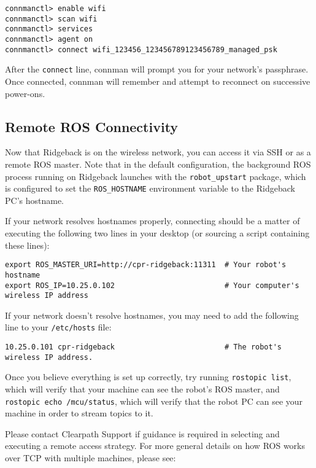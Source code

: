 \documentclass[]{clearpath-latex/clearpath-manual}
\begin{document}
\begin{lstlisting}
connmanctl> enable wifi
connmanctl> scan wifi
connmanctl> services
connmanctl> agent on
connmanctl> connect wifi_123456_123456789123456789_managed_psk
\end{lstlisting}

After the \lstinline{connect} line, connman will prompt you for your network's passphrase. Once connected, connman will remember and attempt to reconnect on successive power-ons.

\subsection{Remote ROS Connectivity}

Now that Ridgeback is on the wireless network, you can access it via SSH or as a remote ROS master. Note that in the default configuration, the background ROS process running on Ridgeback launches with the \lstinline{robot_upstart} package, which is configured to set the \lstinline{ROS_HOSTNAME} environment variable to the Ridgeback PC's hostname.

If your network resolves hostnames properly, connecting should be a matter of executing the following two lines in your desktop (or sourcing a script containing these lines):

\begin{lstlisting}
export ROS_MASTER_URI=http://cpr-ridgeback:11311  # Your robot's hostname
export ROS_IP=10.25.0.102                         # Your computer's wireless IP address
\end{lstlisting}

If your network doesn't resolve hostnames, you may need to add the following line to your \lstinline{/etc/hosts} file:

\begin{lstlisting}
10.25.0.101 cpr-ridgeback                         # The robot's wireless IP address.
\end{lstlisting}

Once you believe everything is set up correctly, try running \lstinline{rostopic list}, which will verify that your machine can see the robot's ROS master, and \lstinline{rostopic echo /mcu/status}, which will verify that the robot PC can see your machine in order to stream topics to it.

Please contact Clearpath Support if guidance is required in selecting and executing a remote access strategy.
For more general details on how ROS works over TCP with multiple machines, please see:
\end{document}
